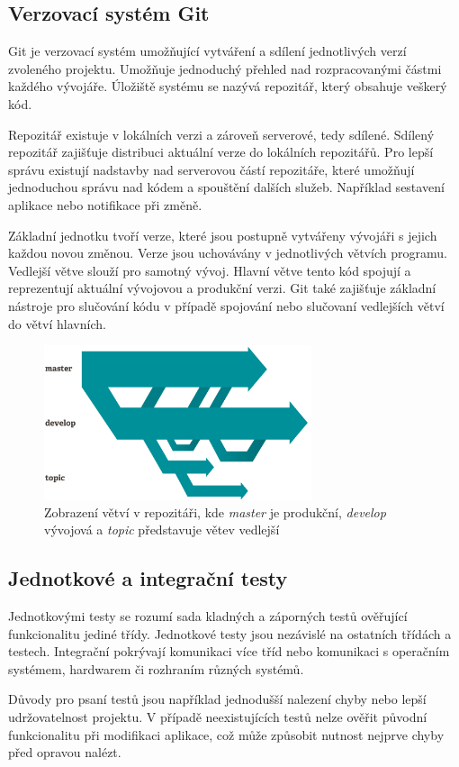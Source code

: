 \documentclass[thesis=B,czech]{FITthesis}[2012/06/26]
\begin{document}
\subsection{Verzovací systém Git}
Git \cite{GIT} je verzovací systém umožňující vytváření a sdílení jednotlivých verzí zvoleného projektu.
Umožňuje jednoduchý přehled nad rozpracovanými částmi každého vývojáře. Úložiště systému se nazývá repozitář, který obsahuje veškerý kód.
\par
Repozitář existuje v lokálních verzi a zároveň serverové, tedy sdílené. Sdílený repozitář zajišťuje distribuci aktuální verze do lokálních 
repozitářů. Pro lepší správu existují nadstavby nad serverovou částí repozitáře, které umožňují jednoduchou
správu nad kódem a spouštění dalších služeb. Například sestavení aplikace nebo notifikace
při změně.
\par
Základní jednotku tvoří verze, které jsou postupně vytvářeny vývojáři s jejich každou novou změnou.
Verze jsou uchovávány v jednotlivých větvích programu. Vedlejší větve slouží pro samotný vývoj. 
Hlavní větve tento kód spojují a reprezentují aktuální vývojovou a produkční verzi. Git také zajišťuje základní nástroje pro slučování kódu v případě spojování nebo slučovaní vedlejších větví do větví hlavních.

\begin{figure}[h]\centering
 	\includegraphics[width=0.7\textwidth]{resources/branches}
	\caption[Větve v Git repozitáři]{Zobrazení větví v repozitáři, kde \textit{master} je produkční, \textit{develop} vývojová a \textit{topic}
	představuje větev vedlejší}\label{fig:vetev}
\end{figure}

\subsection{Jednotkové a integrační testy}
Jednotkovými testy se rozumí sada kladných a záporných testů ověřující funkcionalitu jediné třídy. Jednotkové testy
jsou nezávislé na ostatních třídách a testech. \cite{testing} 
Integrační pokrývají komunikaci více tříd nebo komunikaci s operačním systémem, hardwarem či rozhraním různých systémů. \cite{testing}
\par
Důvody pro psaní testů jsou například jednodušší nalezení chyby nebo lepší udržovatelnost projektu. V případě neexistujících testů nelze ověřit původní
funkcionalitu při modifikaci aplikace, což může způsobit nutnost nejprve chyby před opravou nalézt.\cite{testing}
\end{document}

